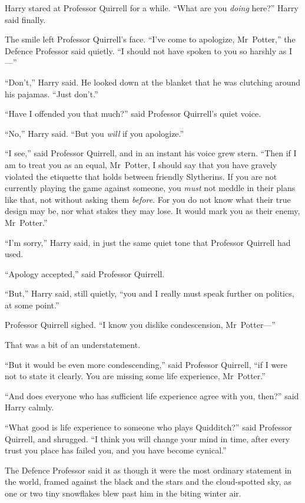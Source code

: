 Harry stared at Professor Quirrell for a while. “What are you \emph{doing} here?” Harry said finally.

The smile left Professor Quirrell’s face. “I’ve come to apologize, Mr~Potter,” the Defence Professor said quietly. “I should not have spoken to you so harshly as I—”

“Don’t,” Harry said. He looked down at the blanket that he was clutching around his pajamas. “Just don’t.”

“Have I offended you that much?” said Professor Quirrell’s quiet voice.

“No,” Harry said. “But you \emph{will} if you apologize.”

“I see,” said Professor Quirrell, and in an instant his voice grew stern. “Then if I am to treat you as an equal, Mr~Potter, I should say that you have gravely violated the etiquette that holds between friendly Slytherins. If you are not currently playing the game against someone, you \emph{must} not meddle in their plans like that, not without asking them \emph{before}. For you do not know what their true design may be, nor what stakes they may lose. It would mark you as their enemy, Mr~Potter.”

“I’m sorry,” Harry said, in just the same quiet tone that Professor Quirrell had used.

“Apology accepted,” said Professor Quirrell.

“But,” Harry said, still quietly, “you and I really must speak further on politics, at some point.”

Professor Quirrell sighed. “I know you dislike condescension, Mr~Potter—”

That was a bit of an understatement.

“But it would be even more condescending,” said Professor Quirrell, “if I were not to state it clearly. You are missing some life experience, Mr~Potter.”

“And does everyone who has sufficient life experience agree with you, then?” said Harry calmly.

“What good is life experience to someone who plays Quidditch?” said Professor Quirrell, and shrugged. “I think you will change your mind in time, after every trust you place has failed you, and you have become cynical.”

The Defence Professor said it as though it were the most ordinary statement in the world, framed against the black and the stars and the cloud-spotted sky, as one or two tiny snowflakes blew past him in the biting winter air.

